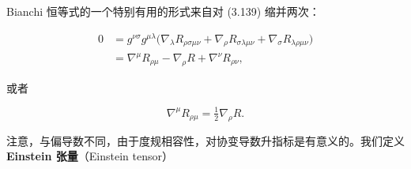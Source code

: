 Bianchi 恒等式的一个特别有用的形式来自对 (3.139) 缩并两次：

\begin{align*}
0 &= g^{\nu\sigma}g^{\mu\lambda}\big(\nabla_\lambda R_{\rho\sigma\mu\nu} + \nabla_\rho R_{\sigma\lambda\mu\nu} + \nabla_\sigma R_{\lambda\rho\mu\nu}\big)\\
&= \nabla^\mu R_{\rho\mu} - \nabla_\rho R + \nabla^\nu R_{\rho\nu}, \tag{3.149}
\end{align*}

或者

\begin{equation*}
\nabla^\mu R_{\rho\mu} = \tfrac{1}{2}\nabla_\rho R. \tag{3.150}
\end{equation*}

注意，与偏导数不同，由于度规相容性，对协变导数升指标是有意义的。我们定义 \textbf{Einstein 张量}（Einstein tensor）


